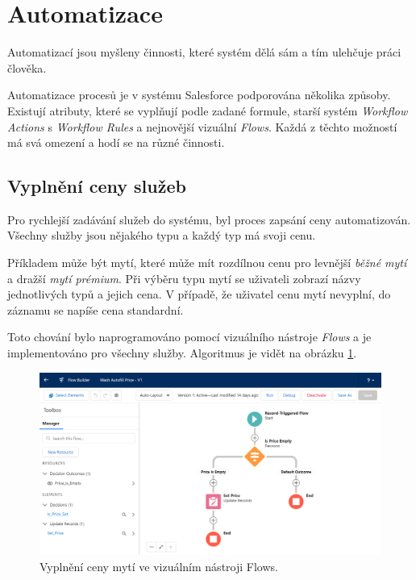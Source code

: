 \section{Automatizace}
Automatizací jsou myšleny činnosti, které systém dělá sám a tím ulehčuje práci člověka.

Automatizace procesů je v systému Salesforce podporována několika způsoby. Existují atributy, které se vyplňují podle zadané formule, starší systém \emph{Workflow Actions} s \emph{Workflow Rules} a nejnovější vizuální \emph{Flows}. Každá z těchto možností má svá omezení a hodí se na různé činnosti.
\subsection{Vyplnění ceny služeb}
Pro rychlejší zadávání služeb do systému, byl proces zapsání ceny automatizován. Všechny služby jsou nějakého typu a každý typ má svoji cenu. 

Příkladem může být mytí, které může mít rozdílnou cenu pro levnější \emph{běžné mytí} a dražší \emph{mytí prémium}. Při výběru typu mytí se uživateli zobrazí názvy jednotlivých typů a jejich cena. V případě, že uživatel cenu mytí nevyplní, do záznamu se napíše cena standardní.

Toto chování bylo naprogramováno pomocí vizuálního nástroje \emph{Flows} a je implementováno pro všechny služby. Algoritmus je vidět na obrázku \ref{fig:wash_price_autofill_flow}.

\begin{figure}[h!]
    \centering
    \includegraphics[width=\textwidth]{assets/7_implementace/automatizace/wash price autofill flow.png}
    \caption{Vyplnění ceny mytí ve vizuálním nástroji Flows.}
    \label{fig:wash_price_autofill_flow}
\end{figure}
\FloatBarrier
